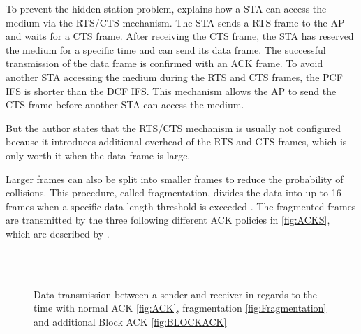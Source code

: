 To prevent the hidden station problem, \textcite[282-283]{sauter_wireless_2022} explains how a \ac{STA} can access the medium
via the \ac{RTS}/\ac{CTS} mechanism.
The \ac{STA} sends a \ac{RTS} frame to the \ac{AP} and waits for a \ac{CTS} frame.
After receiving the \ac{CTS} frame, the \ac{STA} has reserved the medium for a specific time and can send its data frame.
The successful transmission of the data frame is confirmed with an \ac{ACK} frame.
To avoid another \ac{STA} accessing the medium during the \ac{RTS} and \ac{CTS} frames, the \ac{PCF} \ac{IFS} is
shorter than the \ac{DCF} \ac{IFS}.
This mechanism allows the \ac{AP} to send the \ac{CTS} frame before another \ac{STA} can access the medium.

But the author states that the \ac{RTS}/\ac{CTS} mechanism is usually not configured because it introduces additional
overhead of the \ac{RTS} and \ac{CTS} frames, which is only worth it when the data frame is large.

Larger frames can also be split into smaller frames to reduce the probability of collisions.
This procedure, called fragmentation, divides the data into up to \num{16} frames
when a specific data length threshold is exceeded \cite{ieee_standard_2009n}.
The fragmented frames are transmitted by the three following different \ac{ACK} policies in \autoref{fig:ACKS}, which are described by \textcite[334-335]{sauter_wireless_2022}.

\begin{figure}%
    \centering
    \\
    \\
    \caption{Data transmission between a sender and receiver in regards to the time with normal \acf{ACK} \autoref{fig:ACK},
    fragmentation \autoref{fig:Fragmentation} and additional Block \acs{ACK} \autoref{fig:BLOCKACK}}%
    \label{fig:ACKS}%
\end{figure}

